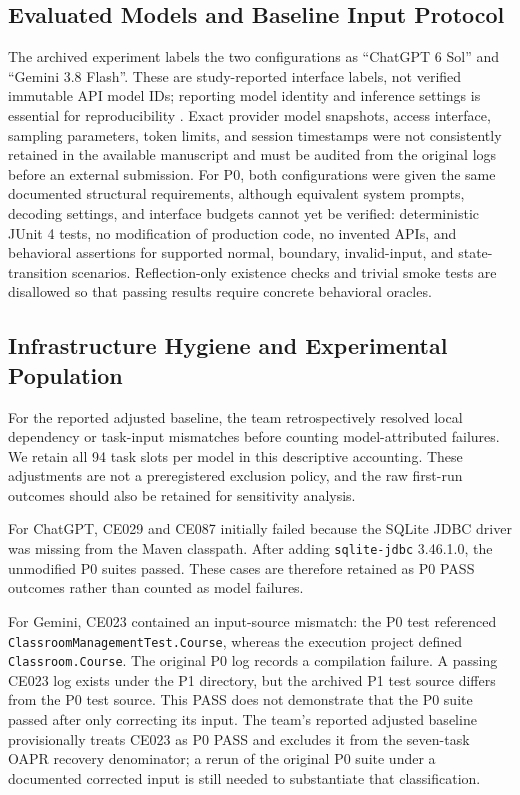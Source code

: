\documentclass[conference]{IEEEtran}
\begin{document}
\subsection{Evaluated Models and Baseline Input Protocol}
The archived experiment labels the two configurations as ``ChatGPT 6 Sol'' and ``Gemini 3.8 Flash''. These are study-reported interface labels, not verified immutable API model IDs; reporting model identity and inference settings is essential for reproducibility \cite{baltes2026guidelines}. Exact provider model snapshots, access interface, sampling parameters, token limits, and session timestamps were not consistently retained in the available manuscript and must be audited from the original logs before an external submission. For P0, both configurations were given the same documented structural requirements, although equivalent system prompts, decoding settings, and interface budgets cannot yet be verified: deterministic JUnit 4 tests, no modification of production code, no invented APIs, and behavioral assertions for supported normal, boundary, invalid-input, and state-transition scenarios. Reflection-only existence checks and trivial smoke tests are disallowed so that passing results require concrete behavioral oracles.

\subsection{Infrastructure Hygiene and Experimental Population}
For the reported adjusted baseline, the team retrospectively resolved local dependency or task-input mismatches before counting model-attributed failures. We retain all 94 task slots per model in this descriptive accounting. These adjustments are not a preregistered exclusion policy, and the raw first-run outcomes should also be retained for sensitivity analysis.

For ChatGPT, CE029 and CE087 initially failed because the SQLite JDBC driver was missing from the Maven classpath. After adding \texttt{sqlite-jdbc} 3.46.1.0, the unmodified P0 suites passed. These cases are therefore retained as P0 PASS outcomes rather than counted as model failures.

For Gemini, CE023 contained an input-source mismatch: the P0 test referenced \texttt{ClassroomManagementTest.Course}, whereas the execution project defined \texttt{Classroom.Course}. The original P0 log records a compilation failure. A passing CE023 log exists under the P1 directory, but the archived P1 test source differs from the P0 test source. This PASS does not demonstrate that the P0 suite passed after only correcting its input. The team's reported adjusted baseline provisionally treats CE023 as P0 PASS and excludes it from the seven-task OAPR recovery denominator; a rerun of the original P0 suite under a documented corrected input is still needed to substantiate that classification.
\end{document}
